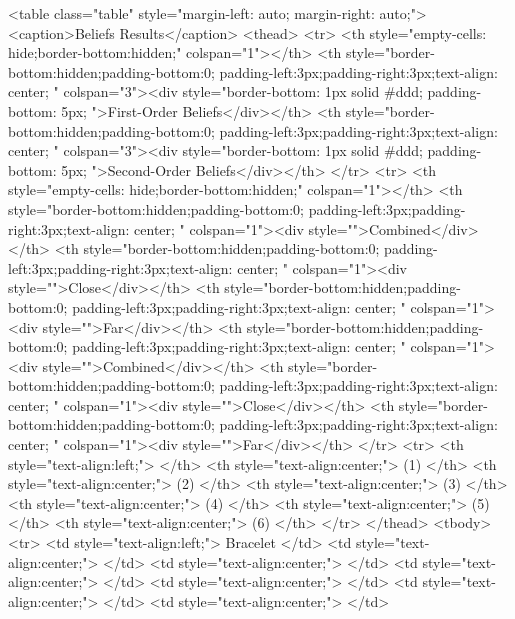 <table class="table" style="margin-left: auto; margin-right: auto;">
<caption>Beliefs Results</caption>
 <thead>
<tr>
<th style="empty-cells: hide;border-bottom:hidden;" colspan="1"></th>
<th style="border-bottom:hidden;padding-bottom:0; padding-left:3px;padding-right:3px;text-align: center; " colspan="3"><div style="border-bottom: 1px solid #ddd; padding-bottom: 5px; ">First-Order Beliefs</div></th>
<th style="border-bottom:hidden;padding-bottom:0; padding-left:3px;padding-right:3px;text-align: center; " colspan="3"><div style="border-bottom: 1px solid #ddd; padding-bottom: 5px; ">Second-Order Beliefs</div></th>
</tr>
<tr>
<th style="empty-cells: hide;border-bottom:hidden;" colspan="1"></th>
<th style="border-bottom:hidden;padding-bottom:0; padding-left:3px;padding-right:3px;text-align: center; " colspan="1"><div style="">Combined</div></th>
<th style="border-bottom:hidden;padding-bottom:0; padding-left:3px;padding-right:3px;text-align: center; " colspan="1"><div style="">Close</div></th>
<th style="border-bottom:hidden;padding-bottom:0; padding-left:3px;padding-right:3px;text-align: center; " colspan="1"><div style="">Far</div></th>
<th style="border-bottom:hidden;padding-bottom:0; padding-left:3px;padding-right:3px;text-align: center; " colspan="1"><div style="">Combined</div></th>
<th style="border-bottom:hidden;padding-bottom:0; padding-left:3px;padding-right:3px;text-align: center; " colspan="1"><div style="">Close</div></th>
<th style="border-bottom:hidden;padding-bottom:0; padding-left:3px;padding-right:3px;text-align: center; " colspan="1"><div style="">Far</div></th>
</tr>
  <tr>
   <th style="text-align:left;">  </th>
   <th style="text-align:center;"> (1) </th>
   <th style="text-align:center;"> (2) </th>
   <th style="text-align:center;"> (3) </th>
   <th style="text-align:center;"> (4) </th>
   <th style="text-align:center;"> (5) </th>
   <th style="text-align:center;"> (6) </th>
  </tr>
 </thead>
<tbody>
  <tr>
   <td style="text-align:left;"> Bracelet </td>
   <td style="text-align:center;">  </td>
   <td style="text-align:center;">  </td>
   <td style="text-align:center;">  </td>
   <td style="text-align:center;">  </td>
   <td style="text-align:center;">  </td>
   <td style="text-align:center;">  </td>
